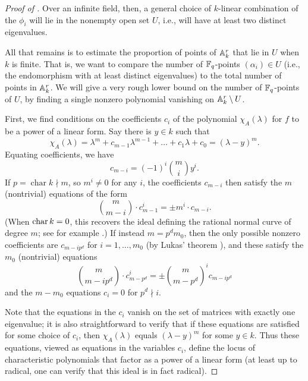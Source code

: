 \documentclass[12pt]{amsart}
\theoremstyle{theorem}
\numberwithin{thm}{section}
\theoremstyle{definition}
\begin{document}
\begin{proof}[Proof of ]
  Over an infinite field, then, a general choice of $k$-linear combination of the $\phi_i$ will lie in the nonempty open set $U$, i.e., will have at least two distinct eigenvalues.

  All that remains is to estimate the proportion of points of $\AA_k^r$ that lie in $U$ when $k$ is finite.
  That is, we want to compare the number of $\F_q$-points $(\alpha_i) \in U$ (i.e., the endomorphism with at least distinct eigenvalues) to the total number of points in $\AA_k^r$.
  We will give a very rough lower bound on the number of $\F_q$-points of $U$, by finding a single nonzero polynomial vanishing on $\AA_k^r\setminus U$.

  First, we find conditions on the coefficients $c_i$ of the polynomial $\chi_A(\lambda)$ for $f$ to be a power of a linear form. Say there is $y \in k$ such that
  $$ \chi_{A}(\lambda) = \lambda^m + c_{m-1} \lambda^{m-1} + \dots + c_1 \lambda + c_0 = (\lambda-y)^m. $$
  Equating coefficients, we have
  $$ c_{m-i} = (-1)^i \binom{m}{i} y^i. $$
  If $p = \operatorname{char} k\nmid m$, so $m^i\neq 0$ for any $i$, the coefficients $c_{m-i}$ then satisfy the $m$ (nontrivial) equations of the form
  \begin{equation}\label{eq:goodchar}
    \binom{m}{m-i} \cdot c_{m-1}^i = \pm m^i\cdot c_{m-i}.
  \end{equation}
  (When $\Char k = 0$, this recovers the ideal defining the rational normal curve of degree $m$; see for example \cite{Chi03,Chi04}.)
  If instead $m = p^d m_0$, then the only possible nonzero coefficients are $c_{m-ip^d}$ for $i=1, \dots, m_0$ (by Lukas' theorem \cite[Lemma~15.22]{Eisenbud95}), and these satisfy the $m_0$ (nontrivial) equations
  \begin{equation}\label{eq:badchar}
    \binom{m}{m-ip^d} \cdot c_{m-p^d}^i =\pm \binom{m}{m-p^d}^i c_{m-i p^d}
  \end{equation}
  and the $m-m_0$ equations $c_i = 0$ for $p^d \nmid i$.

  Note that the equations in the $c_i$ vanish on the set of matrices with exactly one eigenvalue; it is also straightforward
  to verify that if these equations are satisfied for some choice of $c_i$, then $\chi_A(\lambda)$ equals $(\lambda -y)^m$ for some $y \in k$.  Thus these equations, viewed as equations in the variables $c_i$, define the locus of characteristic polynomials that factor as a power of a linear form (at least up to radical, one can verify that this ideal is in fact radical).


\end{proof}
\end{document}

